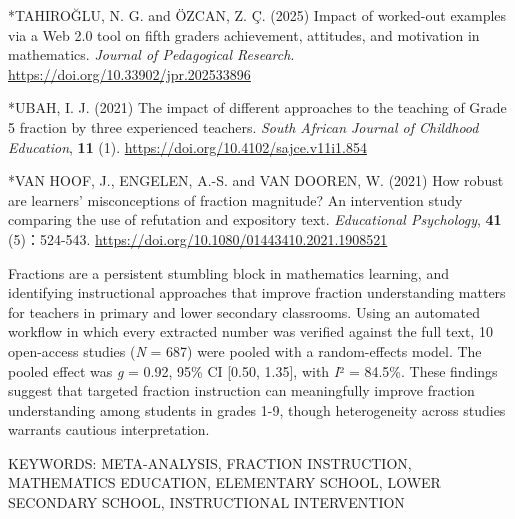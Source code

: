 \documentclass[
  lualatex, ja=standard, paper={182mm,257mm}, twocolumn, fontsize=8.5pt, baselineskip=13.5pt,
  line_length=24zw, column_gap=6.1mm, number_of_lines=45, head_space=24.5mm, gutter=16.25mm
]{jlreq}
\newcommand{\chapspaced}[1]{\par\vspace{13.5pt}\needspace{4\baselineskip}{\centering\gtfamily\bfseries #1\par}\nopagebreak}
\begin{document}
{\par\noindent{}\zw{} *TAHIROĞLU, N. G. and ÖZCAN, Z. Ç. (2025) Impact of worked-out examples via a Web 2.0 tool on fifth graders achievement, attitudes, and motivation in mathematics. \textit{Journal of Pedagogical Research}. \url{https://doi.org/10.33902/jpr.202533896}\par
\par\noindent{}\zw{} *UBAH, I. J. (2021) The impact of different approaches to the teaching of Grade 5 fraction by three experienced teachers. \textit{South African Journal of Childhood Education}, \textbf{11} (1). \url{https://doi.org/10.4102/sajce.v11i1.854}\par
\par\noindent{}\zw{} *VAN HOOF, J., ENGELEN, A.-S. and VAN DOOREN, W. (2021) How robust are learners’ misconceptions of fraction magnitude? An intervention study comparing the use of refutation and expository text. \textit{Educational Psychology}, \textbf{41} (5)：524-543. \url{https://doi.org/10.1080/01443410.2021.1908521}\par
}
\chapspaced{Summary}
{\setlength{\parindent}{1\zw}\noindent Fractions are a persistent stumbling block in mathematics learning, and identifying instructional approaches that improve fraction understanding matters for teachers in primary and lower secondary classrooms. Using an automated workflow in which every extracted number was verified against the full text, 10 open-access studies (\textit{N} = 687) were pooled with a random-effects model. The pooled effect was \textit{g} = 0.92, 95\% CI [0.50, 1.35], with \textit{I}² = 84.5\%. These findings suggest that targeted fraction instruction can meaningfully improve fraction understanding among students in grades 1-9, though heterogeneity across studies warrants cautious interpretation.\par
KEYWORDS: META-ANALYSIS, FRACTION INSTRUCTION, MATHEMATICS EDUCATION, ELEMENTARY SCHOOL, LOWER SECONDARY SCHOOL, INSTRUCTIONAL INTERVENTION\par}
\end{document}
